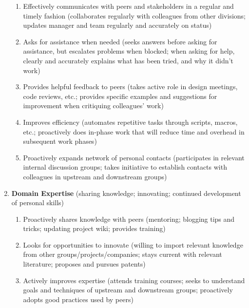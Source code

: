 \documentclass{report}
\begin{document}
\begin{enumerate}
  \begin{enumerate}

  \item Effectively communicates with peers and stakeholders in a
  regular and timely fashion (collaborates regularly with colleagues
  from other divisions; updates manager and team regularly and
  accurately on status)

  \item Asks for assistance when needed (seeks answers before asking
  for assistance, but escalates problems when blocked; when asking for
  help, clearly and accurately explains what has been tried, and why
  it didn't work)

  \item Provides helpful feedback to peers (takes active role in
  design meetings, code reviews, etc.; provides specific examples and
  suggestions for improvement when critiquing colleagues' work)

  \item Improves efficiency (automates repetitive tasks through
  scripts, macros, etc.; proactively does in-phase work that will
  reduce time and overhead in subsequent work phases)

  \item Proactively expands network of personal contacts (participates
  in relevant internal discussion groups; takes initiative to
  establish contacts with colleagues in upstream and downstream
  groups)

  \end{enumerate}

\item \textbf{Domain Expertise} (sharing knowledge; innovating;
continued development of personal skills)

  \begin{enumerate}

  \item Proactively shares knowledge with peers (mentoring; blogging
  tips and tricks; updating project wiki; provides training)

  \item Looks for opportunities to innovate (willing to import
  relevant knowledge from other groups/projects/companies; stays
  current with relevant literature; proposes and pursues patents)

  \item Actively improves expertise (attends training courses; seeks
  to understand goals and techniques of upstream and downstream
  groups; proactively adopts good practices used by peers)


\end{enumerate}
\end{enumerate}
\end{document}
